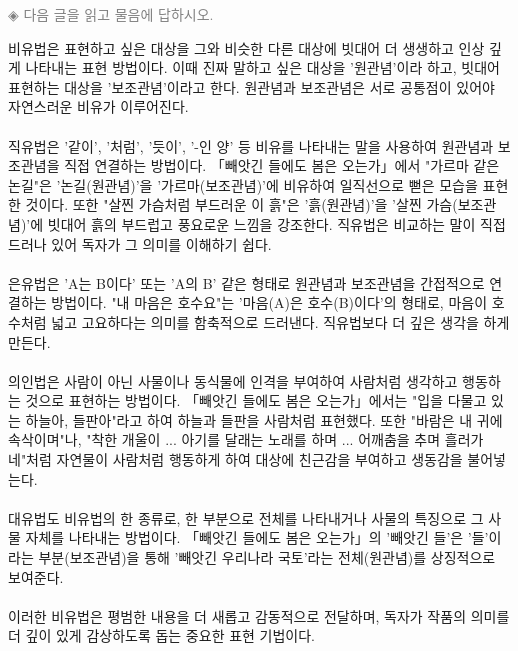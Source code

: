 \documentclass[10pt,a4paper]{article}
\begin{document}
\vspace{4mm}
{\small\textcolor{gray}{◈ 다음 글을 읽고 물음에 답하시오.}}
\vspace{2mm}
\begin{tcolorbox}[passage]
비유법은 표현하고 싶은 대상을 그와 비슷한 다른 대상에 빗대어 더 생생하고 인상 깊게 나타내는 표현 방법이다. 이때 진짜 말하고 싶은 대상을 '원관념'이라 하고, 빗대어 표현하는 대상을 '보조관념'이라고 한다. 원관념과 보조관념은 서로 공통점이 있어야 자연스러운 비유가 이루어진다. \\{}
\vspace{4pt} \\{}
직유법은 '같이', '처럼', '듯이', '-인 양' 등 비유를 나타내는 말을 사용하여 원관념과 보조관념을 직접 연결하는 방법이다. 「빼앗긴 들에도 봄은 오는가」에서 "가르마 같은 논길"은 '논길(원관념)'을 '가르마(보조관념)'에 비유하여 일직선으로 뻗은 모습을 표현한 것이다. 또한 "살찐 가슴처럼 부드러운 이 흙"은 '흙(원관념)'을 '살찐 가슴(보조관념)'에 빗대어 흙의 부드럽고 풍요로운 느낌을 강조한다. 직유법은 비교하는 말이 직접 드러나 있어 독자가 그 의미를 이해하기 쉽다. \\{}
\vspace{4pt} \\{}
은유법은 'A는 B이다' 또는 'A의 B' 같은 형태로 원관념과 보조관념을 간접적으로 연결하는 방법이다. "내 마음은 호수요"는 '마음(A)은 호수(B)이다'의 형태로, 마음이 호수처럼 넓고 고요하다는 의미를 함축적으로 드러낸다. 직유법보다 더 깊은 생각을 하게 만든다. \\{}
\vspace{4pt} \\{}
의인법은 사람이 아닌 사물이나 동식물에 인격을 부여하여 사람처럼 생각하고 행동하는 것으로 표현하는 방법이다. 「빼앗긴 들에도 봄은 오는가」에서는 "입을 다물고 있는 하늘아, 들판아"라고 하여 하늘과 들판을 사람처럼 표현했다. 또한 "바람은 내 귀에 속삭이며"나, "착한 개울이 ... 아기를 달래는 노래를 하며 ... 어깨춤을 추며 흘러가네"처럼 자연물이 사람처럼 행동하게 하여 대상에 친근감을 부여하고 생동감을 불어넣는다. \\{}
\vspace{4pt} \\{}
대유법도 비유법의 한 종류로, 한 부분으로 전체를 나타내거나 사물의 특징으로 그 사물 자체를 나타내는 방법이다. 「빼앗긴 들에도 봄은 오는가」의 '빼앗긴 들'은 '들'이라는 부분(보조관념)을 통해 '빼앗긴 우리나라 국토'라는 전체(원관념)를 상징적으로 보여준다. \\{}
\vspace{4pt} \\{}
이러한 비유법은 평범한 내용을 더 새롭고 감동적으로 전달하며, 독자가 작품의 의미를 더 깊이 있게 감상하도록 돕는 중요한 표현 기법이다.
\end{tcolorbox}
\end{document}
